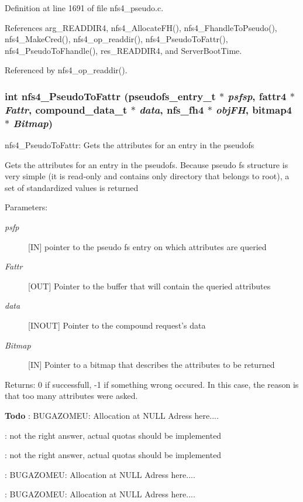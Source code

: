 Definition at line 1691 of file nfs4\_\-pseudo.c.

References arg\_\-READDIR4, nfs4\_\-Allocate\-FH(), nfs4\_\-Fhandle\-To\-Pseudo(), nfs4\_\-Make\-Cred(), nfs4\_\-op\_\-readdir(), nfs4\_\-Pseudo\-To\-Fattr(), nfs4\_\-Pseudo\-To\-Fhandle(), res\_\-READDIR4, and Server\-Boot\-Time.

Referenced by nfs4\_\-op\_\-readdir().
\subsubsection{\setlength{\rightskip}{0pt plus 5cm}int nfs4\_\-Pseudo\-To\-Fattr (pseudofs\_\-entry\_\-t $\ast$ {\em psfsp}, fattr4 $\ast$ {\em Fattr}, compound\_\-data\_\-t $\ast$ {\em data}, nfs\_\-fh4 $\ast$ {\em obj\-FH}, bitmap4 $\ast$ {\em Bitmap})}\label{nfs4__pseudo_8c_a18}


nfs4\_\-Pseudo\-To\-Fattr: Gets the attributes for an entry in the pseudofs

Gets the attributes for an entry in the pseudofs. Because pseudo fs structure is very simple (it is read-only and contains only directory that belongs to root), a set of standardized values is returned

\begin{Desc}
\item[Parameters:]
\begin{description}
\item[{\em psfp}][IN] pointer to the pseudo fs entry on which attributes are queried \item[{\em Fattr}][OUT] Pointer to the buffer that will contain the queried attributes \item[{\em data}][INOUT] Pointer to the compound request's data \item[{\em Bitmap}][IN] Pointer to a bitmap that describes the attributes to be returned\end{description}
\end{Desc}
\begin{Desc}
\item[Returns:]0 if successfull, -1 if something wrong occured. In this case, the reason is that too many attributes were asked.\end{Desc}


\begin{Desc}
\item[{\bf Todo}]: BUGAZOMEU: Allocation at NULL Adress here.... 

: not the right answer, actual quotas should be implemented 

: not the right answer, actual quotas should be implemented 

: BUGAZOMEU: Allocation at NULL Adress here.... 

: BUGAZOMEU: Allocation at NULL Adress here....\end{Desc}


